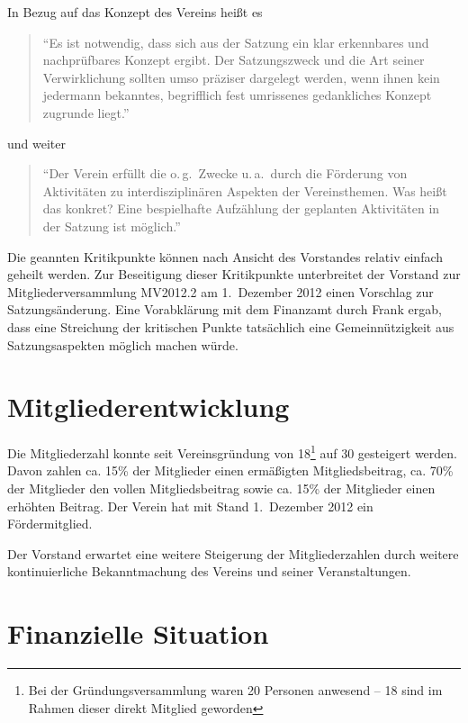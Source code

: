 \documentclass[10pt,DIV16]{scrartcl}
\begin{document}
In Bezug auf das Konzept des Vereins heißt es

\begin{quote}
	"`Es ist notwendig, dass sich aus der Satzung ein klar erkennbares und
	nachprüfbares Konzept ergibt.  Der Satzungszweck und die Art seiner
	Verwirklichung sollten umso präziser dargelegt werden, wenn ihnen kein
	jedermann bekanntes, begrifflich fest umrissenes gedankliches Konzept
	zugrunde liegt."'
\end{quote}

und weiter

\begin{quote}
	"`Der Verein erfüllt die o.\,g.\ Zwecke u.\,a.\ durch \glq die Förderung von
	Aktivitäten zu interdisziplinären Aspekten der Vereinsthemen\grq.  Was heißt
	das konkret?  Eine bespielhafte Aufzählung der geplanten Aktivitäten in
	der Satzung ist möglich."'
\end{quote}

Die geannten Kritikpunkte können nach Ansicht des Vorstandes relativ einfach
geheilt werden. Zur Beseitigung dieser Kritikpunkte unterbreitet der Vorstand
zur Mitgliederversammlung MV2012.2 am 1.~Dezember 2012 einen Vorschlag zur
Satzungsänderung. Eine Vorabklärung mit dem Finanzamt durch Frank ergab, dass
eine Streichung der kritischen Punkte tatsächlich eine Gemeinnützigkeit aus
Satzungsaspekten möglich machen würde.

\section{Mitgliederentwicklung}
\label{sec:mitgliederentwicklung}

Die Mitgliederzahl konnte seit Vereinsgründung von 18\footnote{Bei der
Gründungsversammlung waren 20 Personen anwesend -- 18 sind im Rahmen dieser
direkt Mitglied geworden} auf 30 gesteigert werden.  Davon zahlen ca. 15\% der
Mitglieder einen ermäßigten Mitgliedsbeitrag, ca. 70\% der Mitglieder den
vollen Mitgliedsbeitrag sowie ca. 15\% der Mitglieder einen erhöhten Beitrag.
Der Verein hat mit Stand 1.~Dezember 2012 ein Fördermitglied.

Der Vorstand erwartet eine weitere Steigerung der Mitgliederzahlen durch
weitere kontinuierliche Bekanntmachung des Vereins und seiner
Veranstaltungen.

\section{Finanzielle Situation}
\end{document}
